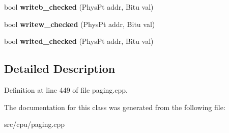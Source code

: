 \begin{DoxyCompactItemize}
\item 
\hypertarget{classExceptionPageHandler_adbf235a475734e4409d64221caeb42e0}{bool {\bfseries writeb\-\_\-checked} (Phys\-Pt addr, Bitu val)}\label{classExceptionPageHandler_adbf235a475734e4409d64221caeb42e0}

\item 
\hypertarget{classExceptionPageHandler_a13741eb7ada1e7c769e9395f827a5646}{bool {\bfseries writew\-\_\-checked} (Phys\-Pt addr, Bitu val)}\label{classExceptionPageHandler_a13741eb7ada1e7c769e9395f827a5646}

\item 
\hypertarget{classExceptionPageHandler_ae2f1819a31546b4bf7338faee9a645c4}{bool {\bfseries writed\-\_\-checked} (Phys\-Pt addr, Bitu val)}\label{classExceptionPageHandler_ae2f1819a31546b4bf7338faee9a645c4}

\end{DoxyCompactItemize}


\subsection{Detailed Description}


Definition at line 449 of file paging.\-cpp.



The documentation for this class was generated from the following file\-:\begin{DoxyCompactItemize}
\item 
src/cpu/paging.\-cpp\end{DoxyCompactItemize}
